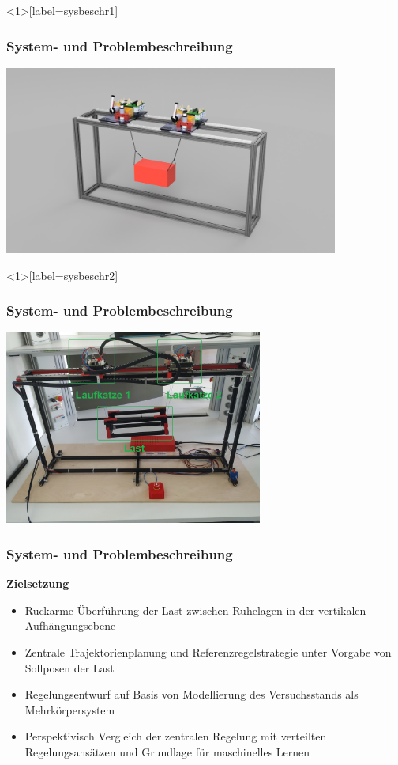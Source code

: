 \documentclass[
	ngerman,
	10pt,				%
	aspectratio=169 	%
]{beamer}
\begin{document}
\begin{frame}<1>[label=sysbeschr1]
	\frametitle{System- { und Problembeschreibung}}
	\begin{center}
		\includegraphics[width=110mm]{images/Veritas_demo_CAD}
	\end{center}

\end{frame}


\begin{frame}<1>[label=sysbeschr2]
	\frametitle{System- { und Problembeschreibung}}
	\begin{center}
		\includegraphics[width=85mm]{images/real_gantry}
	\end{center}
	
\end{frame}


\begin{frame}[label=sysbeschr3]
	\frametitle{System- und Problembeschreibung}
	\textbf{Zielsetzung}
	\begin{itemize}
		\item Ruckarme Überführung der Last zwischen Ruhelagen in der vertikalen Aufhängungsebene
		\pause
		\item Zentrale Trajektorienplanung und Referenzregelstrategie unter Vorgabe von Sollposen der Last
		\pause
		\item Regelungsentwurf auf Basis von Modellierung des Versuchsstands als Mehrkörpersystem
		\pause  
		\item Perspektivisch Vergleich der zentralen Regelung mit verteilten Regelungsansätzen und Grundlage für maschinelles Lernen 
	\end{itemize}
\end{frame}
\end{document}

